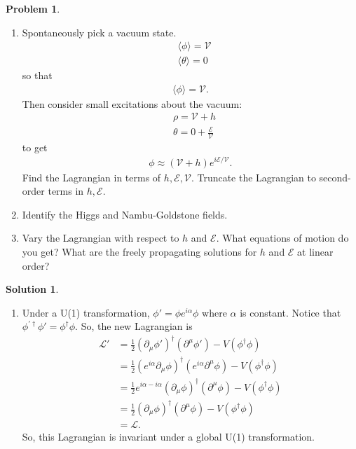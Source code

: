 \documentclass{book}
\numberwithin{equation}{section}
\theoremstyle{definition}
\newtheorem{prob}{Problem}[section]
\newtheorem{sln}{Solution}[section]
\newcommand{\p}{\partial}
\newcommand{\lag}{\mathcal{L}}
\begin{document}
\begin{prob}
\begin{enumerate}
	\item Spontaneously pick a vacuum state. 
		\begin{align}
		&\langle \phi \rangle = \mathcal{V}\\
		&\langle \theta \rangle = 0
		\end{align}
		so that 
		\begin{align}
		\langle \phi \rangle = \mathcal{V}.
		\end{align}
		Then consider small excitations about the vacuum:
		\begin{align}
		&\rho= \mathcal{V} + h\\
		&\theta = 0 + \frac{\mathcal{E}}{\mathcal{V}}
		\end{align}
		to get
		\begin{align}
		\phi \approx (\mathcal{V} + h)e^{i\mathcal{E}/\mathcal{V}}.
		\end{align}
		Find the Lagrangian in terms of $h, \mathcal{E}, \mathcal{V}$. Truncate the Lagrangian to second-order terms in $h, \mathcal{E}$.\\
		
		
		
		\item Identify the Higgs and Nambu-Goldstone fields. \\
		
		
		\item Vary the Lagrangian with respect to $h$ and $\mathcal{E}$. What equations of motion do you get? What are the freely propagating solutions for $h$ and $\mathcal{E}$ at linear order?\\
		
	\end{enumerate}

	\begin{sln}
		$\,$
		\begin{enumerate}
			\item Under a U(1) transformation, $\phi' = \phi e^{i\alpha}\phi$ where $\alpha$ is constant. Notice that $\phi^{'\dagger}\phi' = \phi^\dagger\phi$. So, the new Lagrangian is
			\begin{align}
			\lag' &= \frac{1}{2}(\p_\mu\phi')^\dagger(\p^\mu\phi') - V(\phi^\dagger\phi)\\
			&= \frac{1}{2}\left(e^{i\alpha}\p_\mu\phi\right)^\dagger(e^{i\alpha}\p^\mu\phi) - V(\phi^\dagger\phi)\\
			&= \frac{1}{2}e^{i\alpha - i\alpha}(\p_\mu\phi)^\dagger(\p^\mu\phi) - V(\phi^\dagger\phi)\\
			&= \frac{1}{2}(\p_\mu\phi)^\dagger(\p^\mu\phi) - V(\phi^\dagger\phi)\\
			&= \lag.
			\end{align}
			So, this Lagrangian is invariant under a global U(1) transformation.\\
			

\end{enumerate}
\end{sln}
\end{prob}
\end{document}
